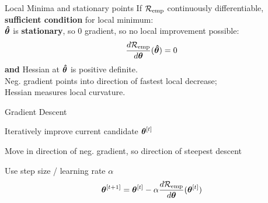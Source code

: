 \documentclass[11pt,compress,t,notes=noshow, xcolor=table]{beamer}
\begin{document}
\begin{frame2}[small]{Local Minima and stationary points}
If $\mathcal{R}_{\text{emp}}$ continuously differentiable, \textbf{sufficient condition} for local minimum: \\
$\bm{\hat\theta}$ is \textbf{stationary}, so 0 gradient, so no local improvement possible:
$$
\frac{d \mathcal{R}_{\text{emp}}}{d\bm{\theta}}(\bm{\hat\theta}) = 0
$$
\textbf{and} Hessian at $\bm{\hat\theta}$ is positive definite. \\
Neg. gradient points into direction of fastest local decrease;\\
Hessian measures local curvature.
\vfill
\begin{figure}[!htb]
\end{figure}
\end{frame2}


\begin{framei}{Gradient Descent}
\item Iteratively improve  current candidate $\bm{\theta}^{[t]}$ 
\item Move in direction of  neg. gradient, so direction of steepest descent
\item Use step size / learning rate $\alpha$ 
$$
\bm{\theta}^{[t+1]} = \bm{\theta}^{[t]} - \alpha \frac{d \mathcal{R}_{\text{emp}}}{d\bm{\theta}}{(\bm{\theta}^{[t]})}
$$
\end{framei}
\end{document}
